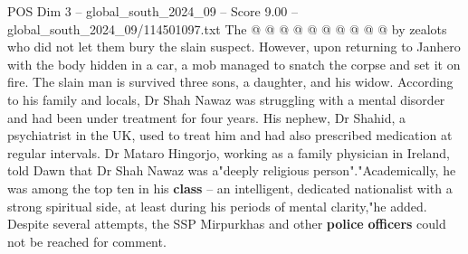 \begin{textsample}{POS Dim 3 – global\_south\_2024\_09 – Score 9.00 – global\_south\_2024\_09/114501097.txt}
The @ @ @ @ @ @ @ @ @ @ by zealots who did not let them bury the slain suspect.
However, upon returning to Janhero with the body hidden in a car, a mob managed to snatch the corpse and set it on fire.
The slain man is survived three sons, a daughter, and his widow.
According to his family and locals, Dr Shah Nawaz was struggling with a mental disorder and had been under treatment for four years.
His nephew, Dr Shahid, a psychiatrist in the UK, used to treat him and had also prescribed medication at regular intervals.
Dr Mataro Hingorjo, working as a family physician in Ireland, told Dawn that Dr Shah Nawaz was a"deeply religious person"."Academically, he was among the top ten in his \textbf{class} -- an intelligent, dedicated nationalist with a strong spiritual side, at least during his periods of mental clarity,"he added.
Despite several attempts, the SSP Mirpurkhas and other \textbf{police} \textbf{officers} could not be reached for comment.

\end{textsample}
